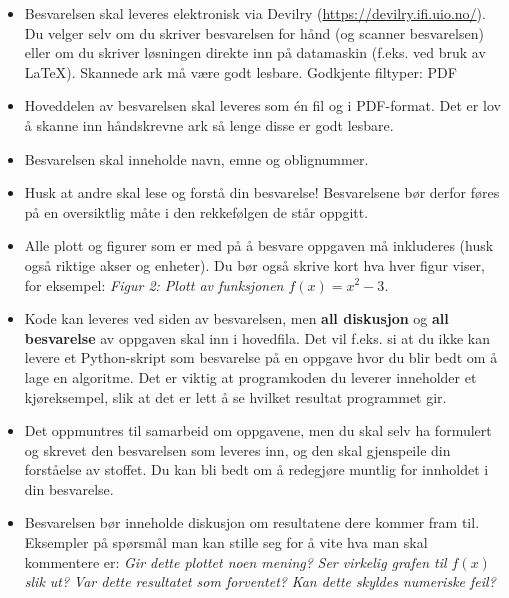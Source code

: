 \documentclass[11pt,norsk,a4paper]{article}
\begin{document}
\begin{itemize}
	\item Besvarelsen skal leveres elektronisk via Devilry (\url{https://devilry.ifi.uio.no/}). Du velger selv om du skriver besvarelsen for hånd (og scanner besvarelsen) eller om du skriver løsningen direkte inn på datamaskin (f.eks. ved bruk av \LaTeX). Skannede ark må være godt lesbare. Godkjente filtyper: PDF

	\item Hoveddelen av besvarelsen skal leveres som én fil og i PDF-format. Det er lov å skanne inn håndskrevne ark så lenge disse er godt lesbare. 

	\item Besvarelsen skal inneholde navn, emne og oblignummer.

	\item Husk at andre skal lese og forstå din besvarelse! Besvarelsene bør derfor føres på en oversiktlig måte i den rekkefølgen de står oppgitt.

	\item Alle plott og figurer som er med på å besvare oppgaven må inkluderes (husk også riktige akser og enheter). Du bør også skrive kort hva hver figur viser, for eksempel:
	\textit{Figur 2: Plott av funksjonen $f(x) = x^2 -3$.}

	\item Kode kan leveres ved siden av besvarelsen, men \textbf{all diskusjon} og \textbf{all besvarelse} av oppgaven skal inn i hovedfila. 
	Det vil f.eks. si at du ikke kan levere et Python-skript som besvarelse på en oppgave hvor du blir bedt om å lage en algoritme. Det er viktig at programkoden du leverer inneholder et kjøreksempel, slik at det er lett å se hvilket resultat programmet gir. 

	\item Det oppmuntres til samarbeid om oppgavene, men du skal selv ha formulert og skrevet den besvarelsen som leveres inn, og den skal gjenspeile din forståelse av stoffet. Du kan bli bedt om å redegjøre muntlig for innholdet i din besvarelse.

	\item Besvarelsen bør inneholde diskusjon om resultatene dere kommer fram til. Eksempler på spørsmål man kan stille seg for å vite hva man skal kommentere er: \textit{Gir dette plottet noen mening?} \textit{Ser virkelig grafen til $f(x)$ slik ut?} \textit{Var dette resultatet som forventet?} \textit{Kan dette skyldes numeriske feil?} 
\end{itemize}
\end{document}
